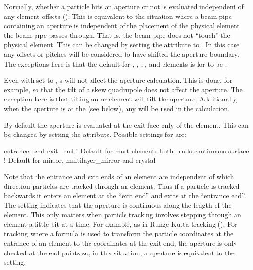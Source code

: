 Normally, whether a particle hits an aperture or not is evaluated
independent of any element offsets (). This is
equivalent to the situation where a beam pipe containing an aperture
is independent of the placement of the physical element the beam pipe
passes through. That is, the beam pipe does not ``touch'' the physical
element. This can be changed by setting the 
attribute to . In this case any offsets or pitches will be
considered to have shifted the aperture boundary. The exceptions here
is that the default for , ,
, , and  elements is for
 to be .

Even with  set to , s will
not affect the aperture calculation. This is done, for example, so
that the tilt of a skew quadrupole does not affect the aperture. The
exception here is that tilting an  or 
element will tilt the aperture. Additionally, when the aperture is at
the  (see below), any  will be used in the
calculation.

By default the aperture is evaluated at the exit face only of the
element. This can be changed by setting the  attribute.
Possible settings for  are:
\begin{example}
  entrance_end
  exit_end       ! Default for most elements
  both_ends
  continuous
  surface        ! Default for mirror, multilayer_mirror and crystal
\end{example}
Note that the entrance and exit ends of an element are independent of
which direction particles are tracked through an element. Thus if a
particle is tracked backwards it enters an element at the ``exit end''
and exits at the ``entrance end''. The  setting
indicates that the aperture is continuous along the length of the
element. This only matters when particle tracking involves stepping
through an element a little bit at a time. For example, as in
Runge-Kutta tracking (). For tracking where a formula is
used to transform the particle coordinates at the entrance of an
element to the coordinates at the exit end, the aperture is only
checked at the end points so, in this situation, a 
aperture is equivalent to the  setting.

